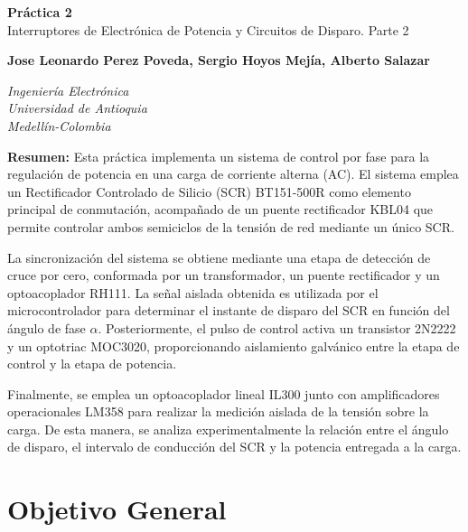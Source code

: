 \documentclass[12pt]{article}
\newcommand{\estudiantes}{Jose Leonardo Perez Poveda, Sergio Hoyos Mejía, Alberto Salazar}
\begin{document}
\begin{center}

    {\Huge
    \textcolor{tituloazul}{
    \textbf{Práctica 2}\\
    Interruptores de Electrónica de Potencia y
    Circuitos de Disparo. Parte 2
    }}

    \vspace{0.6cm}

    {\textbf{\estudiantes}}

    \vspace{0.5cm}

    \textit{Ingeniería Electrónica}\\
    \textit{Universidad de Antioquia}\\
    \textit{Medellín-Colombia}

\end{center}

\vspace{0.5cm}

\noindent
\textcolor{tituloazul}{\textbf{Resumen:}}
Esta práctica implementa un sistema de control por fase para la regulación de
potencia en una carga de corriente alterna (AC). El sistema emplea un
Rectificador Controlado de Silicio (SCR) BT151-500R como elemento principal
de conmutación, acompañado de un puente rectificador KBL04 que permite
controlar ambos semiciclos de la tensión de red mediante un único SCR.

La sincronización del sistema se obtiene mediante una etapa de detección de
cruce por cero, conformada por un transformador, un puente rectificador y un
optoacoplador RH111. La señal aislada obtenida es utilizada por el
microcontrolador para determinar el instante de disparo del SCR en función del
ángulo de fase $\alpha$. Posteriormente, el pulso de control activa un transistor
2N2222 y un optotriac MOC3020, proporcionando aislamiento galvánico entre la
etapa de control y la etapa de potencia.

Finalmente, se emplea un optoacoplador lineal IL300 junto con amplificadores
operacionales LM358 para realizar la medición aislada de la tensión sobre la
carga. De esta manera, se analiza experimentalmente la relación entre el
ángulo de disparo, el intervalo de conducción del SCR y la potencia entregada
a la carga.

\section{Objetivo General}
\end{document}
